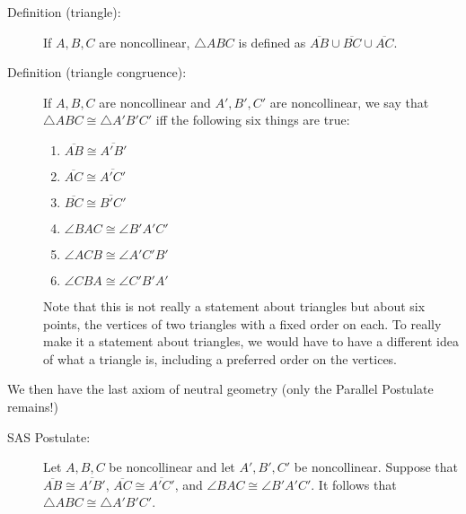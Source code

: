 \documentclass[12pt]{article}
\begin{document}
\begin{description}

\item[Definition (triangle):]  If $A,B,C$ are noncollinear, $\triangle ABC$ is defined as $\overline{AB} \cup \overline{BC} \cup \overline{AC}$.

\item[Definition (triangle congruence):]  If $A,B,C$ are noncollinear and $A',B',C'$ are noncollinear, we say that $\triangle ABC \cong \triangle A'B'C'$ iff the following six things are true:

\begin{enumerate}

\item $\overline{AB} \cong \overline{A'B'}$

\item $\overline{AC} \cong \overline{A'C'}$

\item $\overline{BC} \cong \overline{B'C}'$

\item $\angle BAC \cong \angle B'A'C'$

\item $\angle ACB\cong \angle A'C'B'$

\item $\angle CBA \cong \angle C'B'A'$

\end{enumerate}

Note that this is not really a statement about triangles but about six points, the vertices of two triangles with a fixed order on each.  To really make it a statement about triangles, we would have to have a different idea of what a triangle is, including a preferred order on the vertices.

\end{description}

We then have the last axiom of neutral geometry (only the Parallel Postulate remains!)

\begin{description}

\item[SAS Postulate:]  Let $A,B,C$ be noncollinear and let $A',B',C'$ be noncollinear.  Suppose that $\overline{AB} \cong \overline{A'B'}$, $\overline{AC} \cong \overline{A'C'}$, and $\angle BAC \cong \angle B'A'C'$.
It follows that $\triangle ABC \cong \triangle A'B'C'$.

\end{description}
\end{document}
